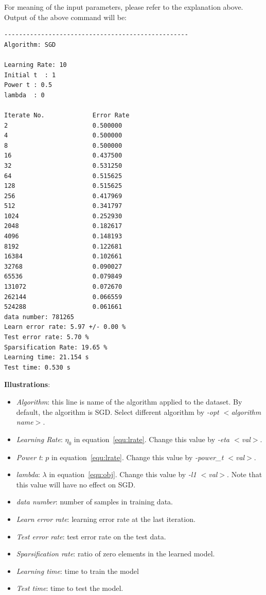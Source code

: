\documentclass[11pt,a4paper]{article}
\newlength{\wideitemsep}
\let\olditem\item
\renewcommand{\item}{\setlength{\itemsep}{\wideitemsep}\olditem}
\begin{document}
For meaning of the input parameters, please refer to the explanation above.
Output of the above command will be:
\lstset{language=bash}
\begin{lstlisting}
--------------------------------------------------
Algorithm: SGD

Learning Rate: 10
Initial t  : 1
Power t : 0.5
lambda  : 0

Iterate No.             Error Rate
2                       0.500000
4                       0.500000
8                       0.500000
16                      0.437500
32                      0.531250
64                      0.515625
128                     0.515625
256                     0.417969
512                     0.341797
1024                    0.252930
2048                    0.182617
4096                    0.148193
8192                    0.122681
16384                   0.102661
32768                   0.090027
65536                   0.079849
131072                  0.072670
262144                  0.066559
524288                  0.061661
data number: 781265
Learn error rate: 5.97 +/- 0.00 %
Test error rate: 5.70 %
Sparsification Rate: 19.65 %
Learning time: 21.154 s
Test time: 0.530 s
\end{lstlisting}

\textbf{Illustrations}:
\begin{itemize}
    \item \emph{Algorithm}: this line is name of the algorithm applied to the dataset.
        By default, the algorithm is SGD. Select different algorithm by
        \emph{-opt $<$algorithm name$>$}. 
    \item \emph{Learning Rate}: $\eta_0$ in equation~\eqref{equ:lrate}. Change
        this value by \emph{-eta $<$val$>$}.
    \item \emph{Power t}: $p$ in equation~\eqref{equ:lrate}. Change this value
        by \emph{-power\_t $<$val$>$}.
    \item \emph{lambda}: $\lambda$ in equation~\eqref{equ:obj}. Change this
        value by \emph{-l1 $<$val$>$}. Note that this value will have no effect on
        SGD.
    \item \emph{data number}: number of samples in training data.
    \item \emph{Learn error rate}: learning error rate at the last iteration.
    \item \emph{Test error rate}: test error rate on the test data.
    \item \emph{Sparsification rate}: ratio of zero elements in the learned
        model.
    \item \emph{Learning time}: time to train the model
    \item \emph{Test time}: time to test the model.
\end{itemize}
\end{document}
